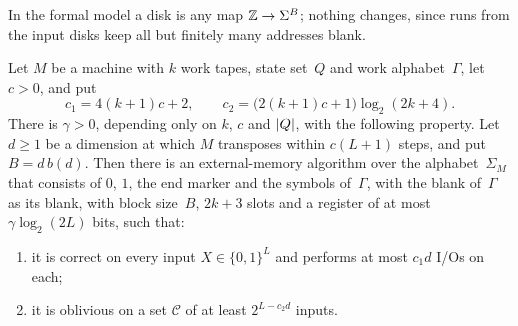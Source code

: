 In the formal model a disk is any map $\mathbb{Z}\to\Sigma^B$; nothing changes, since runs from the input disks keep all but
finitely many addresses blank.

\begin{theorem}\label{thm:EM}
Let $M$ be a machine with $k$ work tapes, state set~$Q$ and work alphabet~$\Gamma$, let $c>0$, and put
\[
 c_1=4(k+1)c+2,\qquad c_2=\bigl(2(k+1)c+1\bigr)\log_2(2k+4).
\]
There is $\gamma>0$, depending only on $k$, $c$ and $\lvert Q \rvert$, with the following property. Let $d\ge1$ be a dimension at
which $M$ transposes within $c(L+1)$ steps, and put $B=d\,b(d)$. Then there is an external-memory algorithm over the
alphabet~$\Sigma_M$ that consists of $0$, $1$, the end marker and the symbols of~$\Gamma$, with the blank of~$\Gamma$ as
its blank, with block size~$B$, $2k+3$ slots and a register of at most $\gamma\log_2(2L)$ bits, such that:
\begin{enumerate}[label=(\roman*)]
\item it is correct on every input $X\in\{0,1\}^L$ and performs at most $c_1d$ I/Os on each;
\item it is oblivious on a set $\mathcal C$ of at least $2^{L-c_2d}$ inputs.
\end{enumerate}
\end{theorem}

